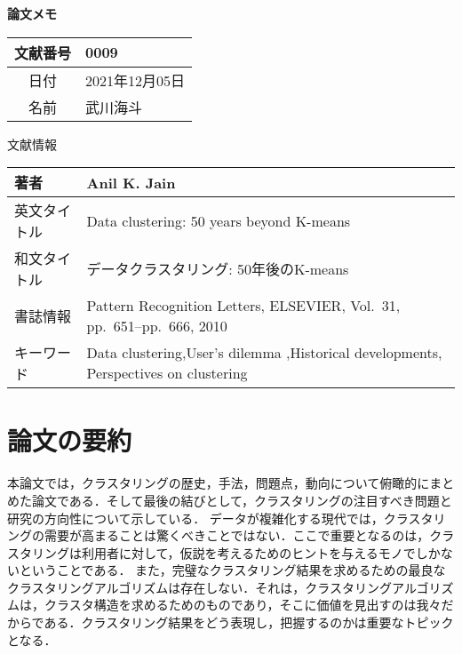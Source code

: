 \documentclass[10pt,onecolumn]{jsarticle}
\begin{document}
\vspace{-20mm}
\begin{center}
{\LARGE\textbf{論文メモ}}
\end{center}

\begin{flushright}
\begin{tabular}{|c|l|}
\hline
文献番号  &  0009
\\
\hline
日付  &  2021年12月05日
\\
\hline
名前  &  武川海斗
\\
\hline
\end{tabular}
\end{flushright}


%
%
\begin{center}
{\large 文献情報}
\begin{table}[hbp]%
\begin{tabular}{|l||l|}
\hline
著者  & Anil K. Jain
\\ \hline
英文タイトル  & Data clustering: 50 years beyond K-means
\\ \hline
和文タイトル  & データクラスタリング: 50年後のK-means
\\ \hline
書誌情報  &  Pattern Recognition Letters, ELSEVIER, Vol.~31, pp.~651--pp.~666, 2010
\\ \hline
キーワード & Data clustering,User’s dilemma ,Historical developments, Perspectives on clustering
\\ \hline
\end{tabular}
\end{table}
\end{center}

\section{論文の要約}
本論文では，クラスタリングの歴史，手法，問題点，動向について俯瞰的にまとめた論文である．そして最後の結びとして，クラスタリングの注目すべき問題と研究の方向性について示している．
データが複雑化する現代では，クラスタリングの需要が高まることは驚くべきことではない．ここで重要となるのは，クラスタリングは利用者に対して，仮説を考えるためのヒントを与えるモノでしかないということである．
また，完璧なクラスタリング結果を求めるための最良なクラスタリングアルゴリズムは存在しない．それは，クラスタリングアルゴリズムは，クラスタ構造を求めるためのものであり，そこに価値を見出すのは我々だからである．クラスタリング結果をどう表現し，把握するのかは重要なトピックとなる．
\end{document}

